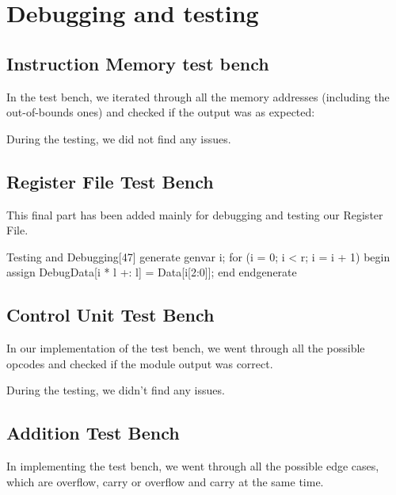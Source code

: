 \section{Debugging and testing}
\subsection{Instruction Memory test bench}

In the test bench, we iterated through all the memory addresses (including the out-of-bounds ones) and checked if the output was as expected:
During the testing, we did not find any issues.
\subsection{Register File Test Bench}
This final part has been added mainly for debugging and testing our Register File.\newline

\begin{code}{Testing and Debugging}[47]
    generate
		genvar i;
		for (i = 0; i < r; i = i + 1) begin
		assign DebugData[i * l +: l] = Data[i[2:0]];
		end
	endgenerate
\end{code}

\subsection{Control Unit Test Bench}

In our implementation of the test bench, we went through all the possible opcodes and checked if the module output was correct.
During the testing, we didn't find any issues.

\subsection{Addition Test Bench}
 In implementing the test bench, we went through all the possible edge cases, which are overflow, carry or overflow and carry at the same time.
